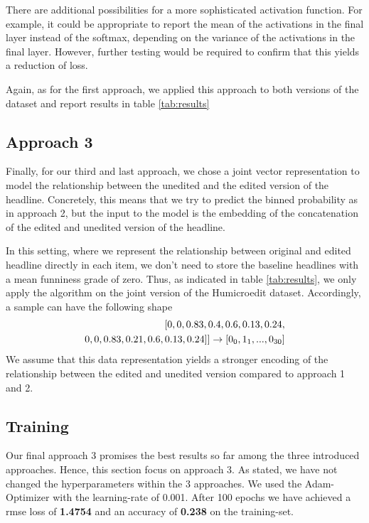 \documentclass[11pt,a4paper]{article}
\begin{document}
There are additional possibilities for a more sophisticated activation function. For example, it could be appropriate to report the mean of the activations in the final layer instead of the softmax, depending on the variance of the activations in the final layer. However, further testing would be required to confirm that this yields a reduction of loss.

Again, as for the first approach, we applied this approach to both versions of the dataset and report results in table \ref{tab:results}

\subsection{Approach 3}
Finally, for our third and last approach, we chose a joint vector representation to model the relationship between the unedited and the edited version of the headline. Concretely, this means that we try to predict the binned probability as in approach 2, but the input to the model is the embedding of the concatenation of the edited and unedited version of the headline. 

In this setting, where we represent the relationship between original and edited headline directly in each item, we don't need to store the baseline headlines with a mean funniness grade of zero. Thus, as indicated in table \ref{tab:results}, we only apply the algorithm on the joint version of the Humicroedit dataset. Accordingly, a sample can have the following shape
\begin{equation}
    \begin{split}
    [0,0,0.83,0.4,0.6,0.13,0.24, \\
    0,0,0.83,0.21,0.6,0.13,0.24]] \rightarrow  [0\textsubscript{0},1\textsubscript{1},..., 0\textsubscript{30}]
    \end{split}
\end{equation}
We assume that this data representation yields a stronger encoding of the relationship between the edited and unedited version compared to approach 1 and 2.


\subsection{Training}
Our final approach 3 promises the best results so far among the three introduced approaches. Hence, this section focus on approach 3. As stated, we have not changed the hyperparameters within the 3 approaches. We used the Adam-Optimizer with the learning-rate of 0.001. After 100 epochs we have achieved a rmse loss of \textbf{1.4754} and an accuracy of \textbf{0.238} on the training-set.
\end{document}
